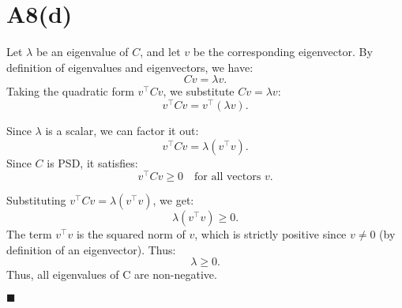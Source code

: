 \documentclass{article}
\begin{document}
\section*{A8(d)}

Let \( \lambda \) be an eigenvalue of \( C \), and let \( v \) be the corresponding eigenvector. By definition of eigenvalues and eigenvectors, we have:
\[
C v = \lambda v.
\]
Taking the quadratic form \( v^\top C v \), we substitute \( C v = \lambda v \):
\[
v^\top C v = v^\top (\lambda v).
\]

Since \( \lambda \) is a scalar, we can factor it out:
\[
v^\top C v = \lambda (v^\top v).
\]
Since \( C \) is PSD, it satisfies:
\[
v^\top C v \geq 0 \quad \text{for all vectors } v.
\]

Substituting \( v^\top C v = \lambda (v^\top v) \), we get:
\[
\lambda (v^\top v) \geq 0.
\]
The term \( v^\top v \) is the squared norm of \( v \), which is strictly positive since \( v \neq 0 \) (by definition of an eigenvector). Thus:
\[
\lambda \geq 0.
\]
Thus, all eigenvalues of C are non-negative.


\hfill\(\blacksquare\)
\end{document}
